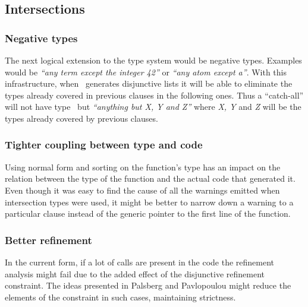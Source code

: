 \subsection{Intersections}

\subsubsection{Negative types}
\label{sct:negative_types}

The next logical extension to the type system would be negative
types. Examples would be \emph{``any term except the integer 42''} or
\emph{``any atom except a''}. With this infrastructure, when
\dr\ generates disjunctive lists it will be able to eliminate the
types already covered in previous clauses in the following ones. Thus
a ``catch-all'' will not have type \any\ but \emph{``anything but X, Y
  and Z''} where \emph{X, Y} and \emph{Z} will be the types already
covered by previous clauses.

\subsubsection{Tighter coupling between type and code}

Using normal form and sorting on the function's type has an impact on
the relation between the type of the function and the actual code that
generated it. Even though it was easy to find the cause of all the
warnings emitted when intersection types were used, it might be better
to narrow down a warning to a particular clause instead of the generic
pointer to the first line of the function.

\subsubsection{Better refinement}

In the current form, if a lot of calls are present in the code the
refinement analysis might fail due to the added effect of the
disjunctive refinement constraint. The ideas presented in Palsberg and
Pavlopoulou \cite{polyvariant} might reduce the elements of the
constraint in such cases, maintaining strictness.
